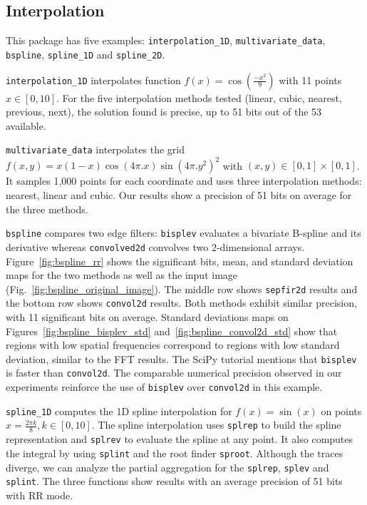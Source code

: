 \documentclass[11pt]{article}
\newcommand{\tristan}[1]{\color{orange}\textbf{From Tristan:} #1\color{black}\xspace}
\begin{document}
\subsection{Interpolation}

This package has five examples: \texttt{interpolation\_1D}, \texttt{multivariate\_data}, \texttt{bspline}, \texttt{spline\_1D} and \texttt{spline\_2D}.

\texttt{interpolation\_1D} interpolates function $f(x)=\cos(\frac{-x^2}{9})$ with 11 points $x\in[0,10]$.
For the five interpolation methods tested (linear, cubic, nearest, previous, next), the solution found is precise, up to 51 bits out of the 53 available.

\texttt{multivariate\_data} interpolates the grid $f(x,y)=x(1-x)\cos(4\pi.x)  \sin(4\pi.y^2)^2$ with $(x,y) \in [0,1] \times [0,1]$. It samples 1,000 points for each coordinate and uses three interpolation methods: nearest, linear and cubic. Our results show a precision of 51 bits on average for the three methods. 

\texttt{bspline} compares two edge filters: \texttt{bisplev} evaluates a bivariate B-spline and its derivative whereas \texttt{convolved2d} convolves two 2-dimensional arrays. Figure~\ref{fig:bspline_rr}
shows the significant bits, mean, and standard deviation 
maps for the two methods as well as the input image (Fig.~\ref{fig:bspline_original_image}). The middle row shows \texttt{sepfir2d} results and the bottom row shows \texttt{convol2d} results. Both methods exhibit similar precision, with 11 significant bits on average. Standard deviations maps on Figures~\ref{fig:bspline_bisplev_std} and~\ref{fig:bspline_convol2d_std} show that regions with low spatial frequencies correspond to regions with low standard deviation, similar to the FFT results. The SciPy tutorial mentions that \texttt{bisplev} is faster than \texttt{convol2d}. The comparable numerical precision observed in our experiments reinforce the use of \texttt{bisplev} over \texttt{convol2d} in this example.

\texttt{spline\_1D} computes the 1D spline interpolation for $f(x)=\sin(x)$ on points $x=\frac{2\pi k}{8}, k \in [0, 10]$. The spline interpolation uses \texttt{splrep} to build the spline representation and \texttt{splrev} to evaluate the spline at any point. It also computes the integral by using \texttt{splint} and the root finder \texttt{sproot}. Although the traces diverge, we can analyze the partial aggregation for the \texttt{splrep}, \texttt{splev} and \texttt{splint}. The three functions show results with an average precision of 51 bits with RR mode.
 
\end{document}
